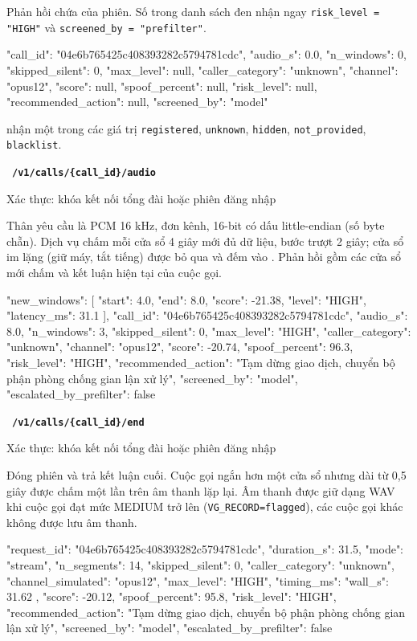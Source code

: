 \documentclass[11pt]{article}
\newcommand{\method}[2]{\par\smallskip\noindent{\colorbox{#1!12}{\textbf{\texttt{\color{#1!70!black}#2}}}}\ }
\newcommand{\POST}[1]{\method{navy}{POST}\texttt{\bfseries #1}\par}
\newcommand{\who}[1]{{\small\color{muted}Xác thực: #1}\par}
\begin{document}
Phản hồi chứa  của phiên. Số trong danh sách đen nhận ngay \texttt{risk\_level = "HIGH"} và \texttt{screened\_by = "prefilter"}.
\begin{code}
{
  "call_id": "04e6b765425c408393282c5794781cdc",
  "audio_s": 0.0, "n_windows": 0, "skipped_silent": 0, "max_level": null,
  "caller_category": "unknown", "channel": "opus12",
  "score": null, "spoof_percent": null, "risk_level": null,
  "recommended_action": null, "screened_by": "model"
}
\end{code}
 nhận một trong các giá trị \texttt{registered}, \texttt{unknown}, \texttt{hidden}, \texttt{not\_provided}, \texttt{blacklist}.

\POST{/v1/calls/\{call\_id\}/audio}
\who{khóa kết nối tổng đài hoặc phiên đăng nhập}
Thân yêu cầu là PCM 16 kHz, đơn kênh, 16-bit có dấu little-endian (số byte chẵn). Dịch vụ chấm mỗi cửa sổ 4 giây mới đủ dữ liệu, bước trượt 2 giây; cửa sổ im lặng (giữ máy, tắt tiếng) được bỏ qua và đếm vào . Phản hồi gồm các cửa sổ mới chấm và kết luận hiện tại của cuộc gọi.
\begin{code}
{
  "new_windows": [
    { "start": 4.0, "end": 8.0, "score": -21.38, "level": "HIGH", "latency_ms": 31.1 }
  ],
  "call_id": "04e6b765425c408393282c5794781cdc",
  "audio_s": 8.0, "n_windows": 3, "skipped_silent": 0, "max_level": "HIGH",
  "caller_category": "unknown", "channel": "opus12",
  "score": -20.74, "spoof_percent": 96.3, "risk_level": "HIGH",
  "recommended_action": "Tạm dừng giao dịch, chuyển bộ phận phòng chống gian lận xử lý",
  "screened_by": "model", "escalated_by_prefilter": false
}
\end{code}

\POST{/v1/calls/\{call\_id\}/end}
\who{khóa kết nối tổng đài hoặc phiên đăng nhập}
Đóng phiên và trả kết luận cuối. Cuộc gọi ngắn hơn một cửa sổ nhưng dài từ 0{,}5 giây được chấm một lần trên âm thanh lặp lại. Âm thanh được giữ dạng WAV khi cuộc gọi đạt mức MEDIUM trở lên (\texttt{VG\_RECORD=flagged}), các cuộc gọi khác không được lưu âm thanh.
\begin{code}
{
  "request_id": "04e6b765425c408393282c5794781cdc",
  "duration_s": 31.5, "mode": "stream", "n_segments": 14, "skipped_silent": 0,
  "caller_category": "unknown", "channel_simulated": "opus12", "max_level": "HIGH",
  "timing_ms": { "wall_s": 31.62 },
  "score": -20.12, "spoof_percent": 95.8, "risk_level": "HIGH",
  "recommended_action": "Tạm dừng giao dịch, chuyển bộ phận phòng chống gian lận xử lý",
  "screened_by": "model", "escalated_by_prefilter": false
}
\end{code}
\end{document}
